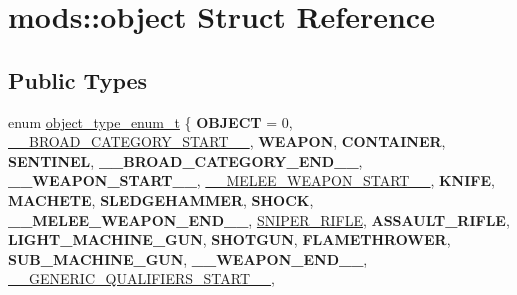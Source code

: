 \hypertarget{structmods_1_1object}{}\section{mods\+:\+:object Struct Reference}
\label{structmods_1_1object}
\subsection*{Public Types}
\begin{DoxyCompactItemize}
\item 
enum \hyperlink{structmods_1_1object_a6a8f895bbe1d2306a097a2090a6caf7f}{object\+\_\+type\+\_\+enum\+\_\+t} \{ \newline
{\bfseries O\+B\+J\+E\+CT} = 0, 
\hyperlink{structmods_1_1object_a6a8f895bbe1d2306a097a2090a6caf7fae2f9f503a7a4760a0c5d2685bfe2f5d3}{\+\_\+\+\_\+\+B\+R\+O\+A\+D\+\_\+\+C\+A\+T\+E\+G\+O\+R\+Y\+\_\+\+S\+T\+A\+R\+T\+\_\+\+\_\+}, 
{\bfseries W\+E\+A\+P\+ON}, 
{\bfseries C\+O\+N\+T\+A\+I\+N\+ER}, 
\newline
{\bfseries S\+E\+N\+T\+I\+N\+EL}, 
{\bfseries \+\_\+\+\_\+\+B\+R\+O\+A\+D\+\_\+\+C\+A\+T\+E\+G\+O\+R\+Y\+\_\+\+E\+N\+D\+\_\+\+\_\+}, 
{\bfseries \+\_\+\+\_\+\+W\+E\+A\+P\+O\+N\+\_\+\+S\+T\+A\+R\+T\+\_\+\+\_\+}, 
\hyperlink{structmods_1_1object_a6a8f895bbe1d2306a097a2090a6caf7facf1fcd6823d976abcd633e0e6a53dc5c}{\+\_\+\+\_\+\+M\+E\+L\+E\+E\+\_\+\+W\+E\+A\+P\+O\+N\+\_\+\+S\+T\+A\+R\+T\+\_\+\+\_\+}, 
\newline
{\bfseries K\+N\+I\+FE}, 
{\bfseries M\+A\+C\+H\+E\+TE}, 
{\bfseries S\+L\+E\+D\+G\+E\+H\+A\+M\+M\+ER}, 
{\bfseries S\+H\+O\+CK}, 
\newline
{\bfseries \+\_\+\+\_\+\+M\+E\+L\+E\+E\+\_\+\+W\+E\+A\+P\+O\+N\+\_\+\+E\+N\+D\+\_\+\+\_\+}, 
\hyperlink{structmods_1_1object_a6a8f895bbe1d2306a097a2090a6caf7fa8df8da1bd1ace695b0cd8ac6929dd15d}{S\+N\+I\+P\+E\+R\+\_\+\+R\+I\+F\+LE}, 
{\bfseries A\+S\+S\+A\+U\+L\+T\+\_\+\+R\+I\+F\+LE}, 
{\bfseries L\+I\+G\+H\+T\+\_\+\+M\+A\+C\+H\+I\+N\+E\+\_\+\+G\+UN}, 
\newline
{\bfseries S\+H\+O\+T\+G\+UN}, 
{\bfseries F\+L\+A\+M\+E\+T\+H\+R\+O\+W\+ER}, 
{\bfseries S\+U\+B\+\_\+\+M\+A\+C\+H\+I\+N\+E\+\_\+\+G\+UN}, 
{\bfseries \+\_\+\+\_\+\+W\+E\+A\+P\+O\+N\+\_\+\+E\+N\+D\+\_\+\+\_\+}, 
\newline
\hyperlink{structmods_1_1object_a6a8f895bbe1d2306a097a2090a6caf7fae9962a42cf5dc1c2f18eba393b462bbe}{\+\_\+\+\_\+\+G\+E\+N\+E\+R\+I\+C\+\_\+\+Q\+U\+A\+L\+I\+F\+I\+E\+R\+S\+\_\+\+S\+T\+A\+R\+T\+\_\+\+\_\+}, 

\end{DoxyCompactItemize}
